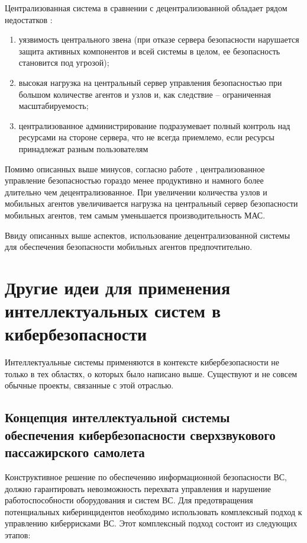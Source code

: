 Централизованная система в сравнении с децентрализованной обладает рядом недостатков \cite{probs}: %
\begin{enumerate}
    \item уязвимость центрального звена (при отказе сервера безопасности
    нарушается защита активных компонентов и всей системы в целом, ее безопасность становится под угрозой);
    \item высокая нагрузка на центральный сервер управления безопасностью при большом количестве агентов
    и узлов и, как следствие – ограниченная масштабируемость;
    \item централизованное администрирование подразумевает полный контроль над ресурсами на стороне сервера,
    что не всегда приемлемо, если ресурсы принадлежат разным пользователям
\end{enumerate}

Помимо описанных выше минусов, согласно работе \cite{mob}, централизованное управление безопасностью
гораздо менее продуктивно и намного более длительно чем децентрализованное. При увеличении количества
узлов и мобильных агентов увеличивается нагрузка на центральный
сервер безопасности мобильных агентов, тем самым уменьшается производительность МАС.

Ввиду описанных выше аспектов, использование децентрализованной системы для обеспечения
безопасности мобильных агентов предпочтительно.

\section{Другие идеи для применения интеллектуальных систем в кибербезопасности}
Интеллектуальные системы применяются в контексте кибербезопасности не только в тех областях, о которых было
написано выше. Существуют и не совсем обычные проекты, связанные с этой отраслью.

\subsection{Концепция интеллектуальной системы обеспечения кибербезопасности сверхзвукового
пассажирского самолета}
Конструктивное решение по обеспечению информационной безопасности ВС, должно гарантировать
невозможность перехвата управления и нарушение работоспособности оборудования и систем ВС.
Для предотвращения потенциальных киберинцидентов необходимо использовать комплексный подход
к управлению киберрисками ВС. Этот комплексный подход состоит
из следующих этапов:

